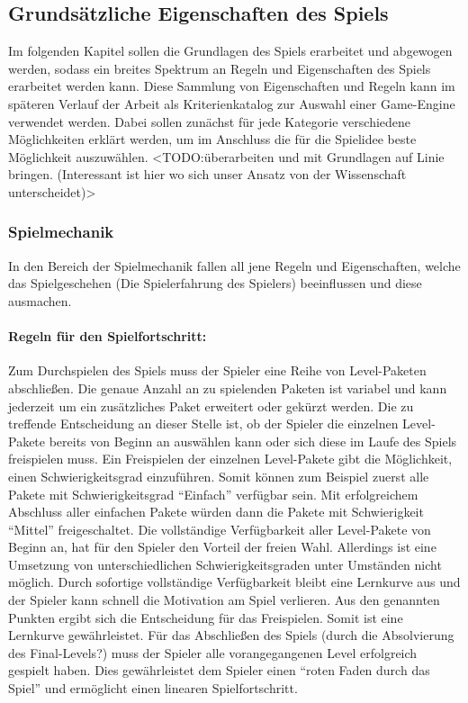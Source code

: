 \subsection{Grundsätzliche Eigenschaften des Spiels}
	Im folgenden Kapitel sollen die Grundlagen des Spiels erarbeitet und abgewogen werden, sodass ein breites Spektrum an Regeln und Eigenschaften des Spiels erarbeitet werden kann. Diese Sammlung von Eigenschaften und Regeln kann im späteren Verlauf der Arbeit als Kriterienkatalog zur Auswahl einer Game-Engine verwendet werden. Dabei sollen zunächst für jede Kategorie verschiedene Möglichkeiten erklärt werden, um im Anschluss die für die Spielidee beste Möglichkeit auszuwählen.
	<TODO:überarbeiten und mit Grundlagen auf Linie bringen. (Interessant ist hier wo sich unser Ansatz von der Wissenschaft unterscheidet)>

	\subsubsection{Spielmechanik}\label{sssec:spielmechanik}
	In den Bereich der Spielmechanik fallen all jene Regeln und Eigenschaften, welche das Spielgeschehen (Die Spielerfahrung des Spielers) beeinflussen und diese ausmachen.

		\paragraph{Regeln für den Spielfortschritt:}
		Zum Durchspielen des Spiels muss der Spieler eine Reihe von Level-Paketen abschließen. Die genaue Anzahl an zu spielenden Paketen ist variabel und kann jederzeit um ein zusätzliches Paket erweitert oder gekürzt werden. Die zu treffende Entscheidung an dieser Stelle ist, ob der Spieler die einzelnen Level-Pakete bereits von Beginn an auswählen kann oder sich diese im Laufe des Spiels freispielen muss. Ein Freispielen der einzelnen Level-Pakete gibt die Möglichkeit, einen Schwierigkeitsgrad einzuführen. Somit können zum Beispiel zuerst alle Pakete mit Schwierigkeitsgrad \enquote{Einfach} verfügbar sein. Mit erfolgreichem Abschluss aller einfachen Pakete würden dann die Pakete mit Schwierigkeit \enquote{Mittel} freigeschaltet.
		Die vollständige Verfügbarkeit aller Level-Pakete von Beginn an, hat für den Spieler den Vorteil der freien Wahl. Allerdings ist eine Umsetzung von unterschiedlichen Schwierigkeitsgraden unter Umständen nicht möglich. Durch sofortige vollständige Verfügbarkeit bleibt eine Lernkurve aus und der Spieler kann schnell die Motivation am Spiel verlieren.
		Aus den genannten Punkten ergibt sich die Entscheidung für das Freispielen. Somit ist eine Lernkurve gewährleistet. Für das Abschließen des Spiels (durch die Absolvierung des Final-Levels?) muss der Spieler alle vorangegangenen Level erfolgreich gespielt haben. Dies gewährleistet dem Spieler einen \enquote{roten Faden durch das Spiel} und ermöglicht einen linearen Spielfortschritt.

